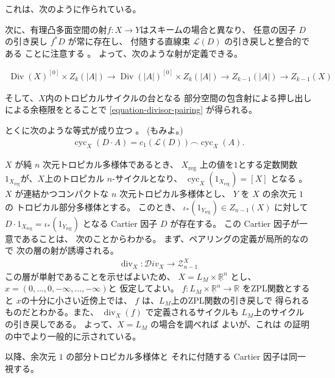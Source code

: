 \documentclass[a4paper,dvipdfmx,reqno,12pt]{amsart}
\theoremstyle{definition}
\newcommand{\opn}[1]{\operatorname{#1}}
\numberwithin{equation}{section}
\begin{document}
これは、次のように作られている。

次に、有理凸多面空間の射$f\colon X\to Y$はスキームの場合と異なり、
任意の因子 $D$ の引き戻し $f^{*}D$ が常に存在し、
付随する直線束 $\mathcal{L}(D)$ の引き戻しと整合的である
ことに注意する
\cite[Propoisition 3.15]{gross2019sheaftheoretic}。
よって、次のような射が定義できる。

\begin{align}
\opn{Div}(X)^{[0]}\times Z_{k}(|A|) \to 
\opn{Div}(|A|)^{[0]} \times Z_{k}(|A|) \to
Z_{k-1}(|A|) \to
Z_{k-1}(X)
\end{align}

そして、$X$内のトロピカルサイクルの台となる
部分空間の包含射による押し出し
による余極限をとることで
\cref{equation-divisor-pairing} が得られる。


とくに次のような等式が成り立つ
\cite[Proposition 5.12]{MR4637248}。
(\cite[Theorem 4.15]{MR3894860}もみよ。)
\begin{align}
\opn{cyc}_X(D\cdot A)=c_1(\mathcal{L}(D))
\frown \opn{cyc}_X(A).
\end{align}

$X$ が純 $n$ 次元トロピカル多様体であるとき、
$X_{\mathrm{reg}}$ 上の値を$1$とする定数関数
$1_{X_{\mathrm{reg}}}$が、$X$上のトロピカル
$n$-サイクルとなり、
$\opn{cyc}_X(1_{X_{\mathrm{reg}}})=[X]$
となる \cite[]{MR4637248}。
$X$ が連結かつコンパクトな $n$ 次元トロピカル多様体とし、
$Y$ を $X$ の余次元 $1$ の
トロピカル部分多様体とする。
このとき、
$\iota_*(1_{Y_{\opn{reg}}})\in Z_{n-1}(X)$ に対して
$D\cdot 1_{X_{\mathrm{reg}}}=\iota_*(1_{Y_{\opn{reg}}})$
となる Cartier 因子 $D$ が存在する。
この Cartier 因子が一意であることは、
次のことからわかる。
まず、ペアリングの定義が局所的なので
次の層の射が誘導される。
\begin{align}
\opn{div}_X\colon \mathcal{D}iv_X\to 
\mathscr{Z}_{n-1}^{X}
\end{align}
この層が単射であることを示せばよいため、
$X=L_M\times \underline{\mathbb{R}}^{n}$ とし、
$x=(0,\ldots,0,-\infty,\ldots,-\infty)$と
仮定してよい。
$f\colon L_M\times \underline{\mathbb{R}}^{n}\to 
\mathbb{R}$ をZPL関数とすると
$x$の十分に小さい近傍上では、
$f$ は、$L_M$上のZPL関数の引き戻しで
得られるものだとわかる。また、
$\opn{div}_X(f)$ で定義されるサイクルも
$L_M$上のサイクルの引き戻しである。
よって、$X=L_M$ の場合を調べれば
よいが、これは
\cite[Theorem 4.5]{MR4246795}
の証明の中でより一般的に示されている。

以降、余次元 $1$ の部分トロピカル多様体と
それに付随する Cartier 因子は同一視する。
\end{document}
